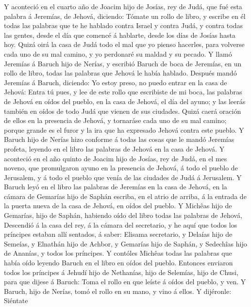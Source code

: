  Y aconteció en el cuarto año de Joacim hijo de Josías, rey
de Judá, que fué esta palabra á Jeremías, de Jehová, diciendo:
 Tómate un rollo de libro, y escribe en él todas las
palabras que te he hablado contra Israel y contra Judá, y contra todas
las gentes, desde el día que comencé á hablarte, desde los días de
Josías hasta hoy.  Quizá oirá la casa de Judá todo el mal
que yo pienso hacerles, para volverse cada uno de su mal camino, y yo
perdonaré su maldad y su pecado.  Y llamó Jeremías á Baruch
hijo de Nerías, y escribió Baruch de boca de Jeremías, en un rollo de
libro, todas las palabras que Jehová le había hablado. 
Después mandó Jeremías á Baruch, diciendo: Yo estoy preso, no puedo
entrar en la casa de Jehová:  Entra tú pues, y lee de este
rollo que escribiste de mi boca, las palabras de Jehová en oídos del
pueblo, en la casa de Jehová, el día del ayuno; y las leerás también en
oídos de todo Judá que vienen de sus ciudades.  Quizá caerá
oración de ellos en la presencia de Jehová, y tornaráse cada uno de su
mal camino; porque grande es el furor y la ira que ha expresado Jehová
contra este pueblo.  Y Baruch hijo de Nerías hizo conforme á
todas las cosas que le mandó Jeremías profeta, leyendo en el libro las
palabras de Jehová en la casa de Jehová.  Y aconteció en el
año quinto de Joacim hijo de Josías, rey de Judá, en el mes noveno, que
promulgaron ayuno en la presencia de Jehová, á todo el pueblo de
Jerusalem, y á todo el pueblo que venía de las ciudades de Judá á
Jerusalem.  Y Baruch leyó en el libro las palabras de
Jeremías en la casa de Jehová, en la cámara de Gemarías hijo de Saphán
escriba, en el atrio de arriba, á la entrada de la puerta nueva de la
casa de Jehová, en oídos del pueblo.  Y Michêas hijo de
Gemarías, hijo de Saphán, habiendo oído del libro todas las palabras de
Jehová,  Descendió á la casa del rey, á la cámara del
secretario, y he aquí que todos los príncipes estaban allí sentados, á
saber: Elisama secretario, y Delaías hijo de Semeías, y Elnathán hijo de
Achbor, y Gemarías hijo de Saphán, y Sedechîas hijo de Ananías, y todos
los príncipes.  Y contóles Michêas todas las palabras que
había oído leyendo Baruch en el libro en oídos del pueblo. 
Entonces enviaron todos los príncipes á Jehudí hijo de Nethanías, hijo
de Selemías, hijo de Chusi, para que dijese á Baruch: Toma el rollo en
que leíste á oídos del pueblo, y ven. Y Baruch, hijo de Nerías, tomó el
rollo en su mano, y vino á ellos.  Y dijéronle: Siéntate
